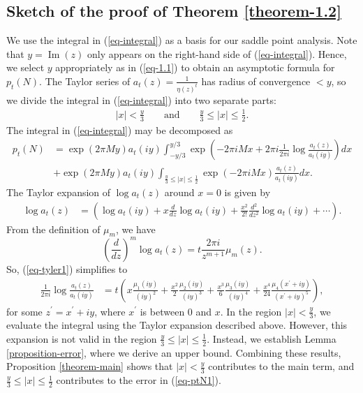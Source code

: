 \documentclass[11pt]{amsart}
\theoremstyle{plain}
\renewcommand{\Im}{\operatorname{Im}}
\numberwithin{equation}{section}
\begin{document}
	\subsection{\texorpdfstring{Sketch of the proof of Theorem \ref{theorem-1.2}}{}} 
	We use the integral in (\ref{eq-integral}) as a basis for our saddle point analysis. 
	Note that  $y=\Im (z)$ only appears on the right-hand side of (\ref{eq-integral}).
	Hence, we select $y$ appropriately as in (\ref{eq-1.1}) to obtain an asymptotic formula for $p_t(N)$. 
	The Taylor series of $a_t(z)=\frac{1}{\eta(z)^{t}}$ has radius of convergence $<y$, so we divide the integral in (\ref{eq-integral}) into two separate parts:
	\begin{align*}
		|x| < \frac{y}{3} 
		\qquad \text{and} \qquad 
		\frac{y}{3} \le |x| \le \frac{1}{2}.
	\end{align*}
	The integral in (\ref{eq-integral}) may be decomposed as
	\begin{equation}
		\begin{aligned}\label{eq-ptN1}
			p_{t}(N)&=\exp(2\pi My)a_{t}(iy)\int_{-y/3}^{y/3}\exp\left(-2\pi i Mx+2\pi i\frac{1}{2\pi i}\log\frac{a_{t}(z)}{a_{t}(iy)}\right)dx\\
			&+\exp(2\pi My)a_{t}(iy)\int_{\frac{y}{3}\le |x|\le \frac{1}{2}}\exp\left(-2\pi i Mx\right)\frac{a_{t}(z)}{a_{t}(iy)}dx.
		\end{aligned}
	\end{equation}   
	The Taylor expansion of $\log a_t(z)$ around $x=0$ is given by
	\begin{align}\label{eq-tyler1}
		\log a_{t}(z)&=\left(\log a_{t}(iy)+x\frac{d}{dz} \log a_{t}(iy)+\frac{x^{2}}{2!}\frac{d^{2}}{dz^{2}}\log a_{t}(iy)+\cdots\right).
	\end{align}
	From the definition of $\mu_m$, we have
	\begin{equation*}
		\left(\frac{d}{dz}\right)^{m}\log a_{t}(z)=t\frac{2\pi i}{z^{m+1}}\mu_{m}(z).
	\end{equation*}
	So, (\ref{eq-tyler1}) simplifies to
	\begin{align}\label{eq-taylor}
		\frac{1}{2\pi i}\log \frac{a_{t}(z)}{a_{t}(iy)}
		&=t\left(x\frac{\mu_{1}(iy)}{(iy)^{2}}+\frac{x^{2}}{2}\frac{\mu_{2}(iy)}{(iy)^{3}}+\frac{x^{3}}{6}\frac{\mu_{3}(iy)}{(iy)^{4}}+\frac{x^{4}}{24}\frac{\mu_{4}(x^{\prime}+iy)}{(x^{\prime}+iy)^{5}}\right),
	\end{align}
	for some $z^{\prime}=x^{\prime}+iy$, where $x^{\prime}$ is between $0$ and $x$. In the region $|x|<\frac{y}{3}$, we evaluate the integral using the Taylor expansion described above. However, this expansion is not valid in the region $\frac{y}{3} \le |x| \le \frac{1}{2}$. Instead, we establish Lemma \ref{proposition-error}, where we derive an upper bound. Combining these results, Proposition \ref{theorem-main} shows that $|x|<\frac{y}{3}$ contributes to the main term, and $\frac{y}{3}\le |x|\le \frac{1}{2}$ contributes to the error in (\ref{eq-ptN1}).
	
\end{document}
